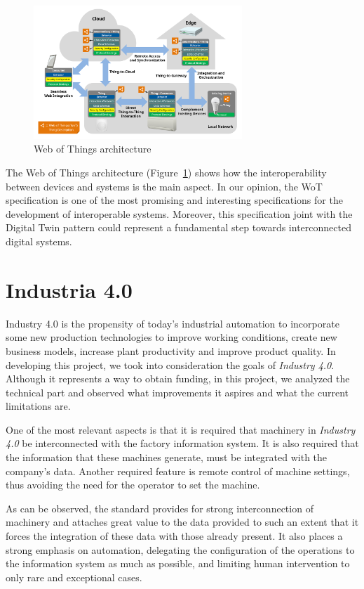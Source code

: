 \begin{figure}[h]
	\centering
	\includegraphics[width=0.7\textwidth]{img/wot.png}
	\caption{Web of Things architecture}
	\label{fig:iot}
\end{figure}

The Web of Things architecture (Figure~\ref{fig:iot}) shows how the interoperability between devices and systems is the main aspect.
In our opinion, the WoT specification is one of the most promising and interesting specifications for the development of interoperable systems.
Moreover, this specification joint with the Digital Twin pattern could represent a fundamental step towards interconnected digital systems.

\section{Industria 4.0}
Industry 4.0 is the propensity of today's industrial automation to incorporate some new production technologies to improve working conditions, create
new business models, increase plant productivity and improve product quality.
In developing this project, we took into consideration the goals of \textit{Industry 4.0}. Although it represents a way to obtain funding,
in this project, we analyzed the technical part and observed what improvements it aspires and what the current limitations are.


One of the most relevant aspects is that it is required that machinery in \textit{Industry 4.0} be interconnected with the factory information
system. It is also required that the information that these machines generate, must be integrated with the company's data.
Another required feature is remote control of machine settings, thus avoiding the need for the operator to set the machine.

As can be observed, the standard provides for strong interconnection of machinery and attaches great value to the data provided to such an extent that it forces the integration of these data with those already present. It also places a strong emphasis on automation, delegating the configuration of the operations to the information system as much as possible, and limiting human intervention to only rare and exceptional cases.

